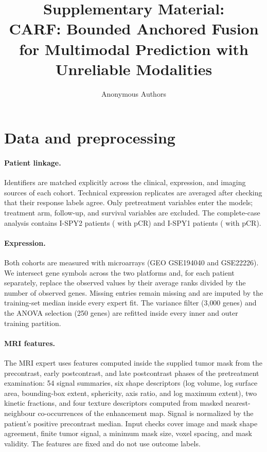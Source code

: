 \documentclass[runningheads]{llncs}
\begin{document}
\title{Supplementary Material:\\ CARF: Bounded Anchored Fusion for Multimodal Prediction with Unreliable Modalities}
\author{Anonymous Authors}
\maketitle

\setcounter{section}{0}
\renewcommand{\thesection}{S\arabic{section}}
\renewcommand{\thetable}{S\arabic{table}}
\renewcommand{\thefigure}{S\arabic{figure}}

\section{Data and preprocessing}

\paragraph{Patient linkage.} Identifiers are matched explicitly across the clinical, expression, and imaging sources of each cohort. Technical expression replicates are averaged after checking that their response labels agree. Only pretreatment variables enter the models; treatment arm, follow-up, and survival variables are excluded. The complete-case analysis contains \NDev{} I-SPY2 patients (\NDevPos{} with pCR) and \NExt{} I-SPY1 patients (\NExtPos{} with pCR).

\paragraph{Expression.} Both cohorts are measured with microarrays (GEO GSE194040 and GSE22226). We intersect gene symbols across the two platforms and, for each patient separately, replace the observed values by their average ranks divided by the number of observed genes. Missing entries remain missing and are imputed by the training-set median inside every expert fit. The variance filter (3{,}000 genes) and the ANOVA selection (250 genes) are refitted inside every inner and outer training partition.

\paragraph{MRI features.} The MRI expert uses \NMriFeat{} features computed inside the supplied tumor mask from the precontrast, early postcontrast, and late postcontrast phases of the pretreatment examination: 54 signal summaries, six shape descriptors (log volume, log surface area, bounding-box extent, sphericity, axis ratio, and log maximum extent), two kinetic fractions, and four texture descriptors computed from masked nearest-neighbour co-occurrences of the enhancement map. Signal is normalized by the patient's positive precontrast median. Input checks cover image and mask shape agreement, finite tumor signal, a minimum mask size, voxel spacing, and mask validity. The features are fixed and do not use outcome labels.
\end{document}
